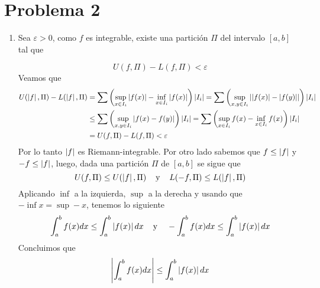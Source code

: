 \documentclass{article}
\begin{document}
\section*{Problema 2}
\begin{enumerate}
    \item Sea $\varepsilon>0$, como $f$ es integrable, existe una partición $\Pi$ del intervalo 
    $[a,b]$ tal que
    
    \begin{equation*}
        U(f,\Pi)-L(f,\Pi)<\varepsilon
    \end{equation*}
    Veamos que
    \begin{align*}
        U(\left|f \right|,\Pi)-L(\left|f \right|,\Pi) &= \sum \left(\sup_{x\in I_{i}}\left|f(x) \right|-
        \inf_{x\in I_{i}}\left|f(x) \right|\right)\left|I_{i} \right|=\sum \left(\sup_{x,y\in I_{i}}
        \left|\left|f(x) \right|-\left|f(y) \right| \right|\right)\left|I_{i} \right|\\
        & \leq\sum \left(\sup_{x,y\in I_{i}}\left|f(x)-f(y) \right|\right)\left|I_{i} \right|
        =\sum \left(\sup_{x\in I_{i}}f(x)-\inf_{x\in I_{i}}f(x)\right)\left|I_{i} \right| \\
        & =U(f,\Pi)-L(f,\Pi)<\varepsilon
    \end{align*}
    Por lo tanto $\left|f \right|$ es Riemann-integrable. Por otro lado sabemos que $f\leq\left|f \right|$ y 
    $-f\leq\left|f \right|$, luego, dada una partición $\Pi$ de $[a,b]$ se sigue que
    \begin{equation*}
        U(f,\Pi)\leq U(\left|f \right|,\Pi)\hspace{4mm}\text{y}\hspace{4mm}L(-f,\Pi)\leq L(\left|f \right|,\Pi)
    \end{equation*}
    Aplicando $\inf$ a la izquierda, $\sup$ a la derecha y usando que $-\inf x=\sup -x$, tenemos 
    lo siguiente
    \begin{equation*}
        \int_{a}^{b}f(x)dx\leq\int_{a}^{b}\left|f(x) \right|dx\hspace{4mm}\text{y}\hspace{4mm}
        -\int_{a}^{b}f(x)dx\leq\int_{a}^{b}\left|f(x) \right|dx
    \end{equation*}
    Concluimos que
    \begin{equation*}
        \left|\int_{a}^{b}f(x)dx \right|\leq\int_{a}^{b}\left|f(x) \right|dx
    \end{equation*}


\end{enumerate}
\end{document}
